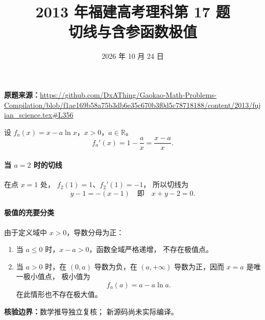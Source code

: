 \documentclass[UTF8,a4paper,11pt]{ctexart}
\title{2013 年福建高考理科第 17 题\\切线与含参函数极值}
\date{2026 年 10 月 24 日}
\begin{document}
\maketitle
\noindent\textbf{原题来源：}\url{https://github.com/DxAThing/Gaokao-Math-Problems-Compilation/blob/f1ae169b58a75b3db6e35c670b3f0d5c78718188/content/2013/fujian_science.tex#L356}

设 $f_a(x)=x-a\ln x$，$x>0$，$a\in\mathbb R$。
\[
 f_a'(x)=1-\frac{a}{x}=\frac{x-a}{x}.
\]
\paragraph{当 $a=2$ 时的切线}
在点 $x=1$ 处，
$f_2(1)=1$、$f_2'(1)=-1$，
所以切线为
\[
 \boxed{y-1=-(x-1)}\quad\text{即}\quad x+y-2=0.
\]

\paragraph{极值的充要分类}
由于定义域中 $x>0$，导数分母为正：
\begin{enumerate}
\item 当 $a\le0$ 时，$x-a>0$，函数全域严格递增，
不存在极值点。
\item 当 $a>0$ 时，在 $(0,a)$ 导数为负，在
$(a,+\infty)$ 导数为正，因而 $x=a$ 是唯一极小值点，
极小值为
\[
 \boxed{f_a(a)=a-a\ln a}.
\]
在此情形也不存在极大值。
\end{enumerate}
\noindent\textbf{核验边界：}数学推导独立复核；
新源码尚未实际编译。
\end{document}
